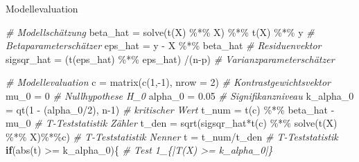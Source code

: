 \documentclass[
  8pt,
  ignorenonframetext,
]{beamer}
\newenvironment{Shaded}{\begin{snugshade}}{\end{snugshade}}
\newcommand{\AttributeTok}[1]{\textcolor[rgb]{0.77,0.63,0.00}{#1}}
\newcommand{\CommentTok}[1]{\textcolor[rgb]{0.56,0.35,0.01}{\textit{#1}}}
\newcommand{\ControlFlowTok}[1]{\textcolor[rgb]{0.13,0.29,0.53}{\textbf{#1}}}
\newcommand{\DecValTok}[1]{\textcolor[rgb]{0.00,0.00,0.81}{#1}}
\newcommand{\FloatTok}[1]{\textcolor[rgb]{0.00,0.00,0.81}{#1}}
\newcommand{\FunctionTok}[1]{\textcolor[rgb]{0.00,0.00,0.00}{#1}}
\newcommand{\NormalTok}[1]{#1}
\newcommand{\OtherTok}[1]{\textcolor[rgb]{0.56,0.35,0.01}{#1}}
\newcommand{\SpecialCharTok}[1]{\textcolor[rgb]{0.00,0.00,0.00}{#1}}
\begin{document}
\begin{frame}[fragile]{Modellevaluation}
\begin{Shaded}
\begin{Highlighting}[]
\CommentTok{\# Modellschätzung}
\NormalTok{beta\_hat   }\OtherTok{=} \FunctionTok{solve}\NormalTok{(}\FunctionTok{t}\NormalTok{(X) }\SpecialCharTok{\%*\%}\NormalTok{ X) }\SpecialCharTok{\%*\%} \FunctionTok{t}\NormalTok{(X) }\SpecialCharTok{\%*\%}\NormalTok{ y                     }\CommentTok{\# Betaparameterschätzer}
\NormalTok{eps\_hat    }\OtherTok{=}\NormalTok{ y }\SpecialCharTok{{-}}\NormalTok{ X }\SpecialCharTok{\%*\%}\NormalTok{ beta\_hat                                   }\CommentTok{\# Residuenvektor}
\NormalTok{sigsqr\_hat }\OtherTok{=}\NormalTok{ (}\FunctionTok{t}\NormalTok{(eps\_hat) }\SpecialCharTok{\%*\%}\NormalTok{ eps\_hat) }\SpecialCharTok{/}\NormalTok{(n}\SpecialCharTok{{-}}\NormalTok{p)                      }\CommentTok{\# Varianzparameterschätzer}

\CommentTok{\# Modellevaluation}
\NormalTok{c          }\OtherTok{=} \FunctionTok{matrix}\NormalTok{(}\FunctionTok{c}\NormalTok{(}\DecValTok{1}\NormalTok{,}\SpecialCharTok{{-}}\DecValTok{1}\NormalTok{), }\AttributeTok{nrow =} \DecValTok{2}\NormalTok{)                            }\CommentTok{\# Kontrastgewichtsvektor}
\NormalTok{mu\_0       }\OtherTok{=} \DecValTok{0}                                                    \CommentTok{\# Nullhypothese H\_0}
\NormalTok{alpha\_0    }\OtherTok{=} \FloatTok{0.05}                                                 \CommentTok{\# Signifikanzniveau}
\NormalTok{k\_alpha\_0  }\OtherTok{=} \FunctionTok{qt}\NormalTok{(}\DecValTok{1} \SpecialCharTok{{-}}\NormalTok{ (alpha\_0}\SpecialCharTok{/}\DecValTok{2}\NormalTok{), n}\DecValTok{{-}1}\NormalTok{)                             }\CommentTok{\# kritischer Wert}
\NormalTok{t\_num      }\OtherTok{=} \FunctionTok{t}\NormalTok{(c) }\SpecialCharTok{\%*\%}\NormalTok{ beta\_hat }\SpecialCharTok{{-}}\NormalTok{ mu\_0                             }\CommentTok{\# T{-}Teststatistik Zähler}
\NormalTok{t\_den      }\OtherTok{=} \FunctionTok{sqrt}\NormalTok{(sigsqr\_hat}\SpecialCharTok{*}\FunctionTok{t}\NormalTok{(c) }\SpecialCharTok{\%*\%} \FunctionTok{solve}\NormalTok{(}\FunctionTok{t}\NormalTok{(X) }\SpecialCharTok{\%*\%}\NormalTok{ X)}\SpecialCharTok{\%*\%}\NormalTok{c)      }\CommentTok{\# T{-}Teststatistik Nenner}
\NormalTok{t          }\OtherTok{=}\NormalTok{ t\_num}\SpecialCharTok{/}\NormalTok{t\_den                                          }\CommentTok{\# T{-}Teststatistik}
\ControlFlowTok{if}\NormalTok{(}\FunctionTok{abs}\NormalTok{(t) }\SpecialCharTok{\textgreater{}=}\NormalTok{ k\_alpha\_0)\{                                          }\CommentTok{\# Test 1\_\{|T(X) \textgreater{}= k\_alpha\_0|\}}

\end{Highlighting}
\end{Shaded}
\end{frame}
\end{document}
